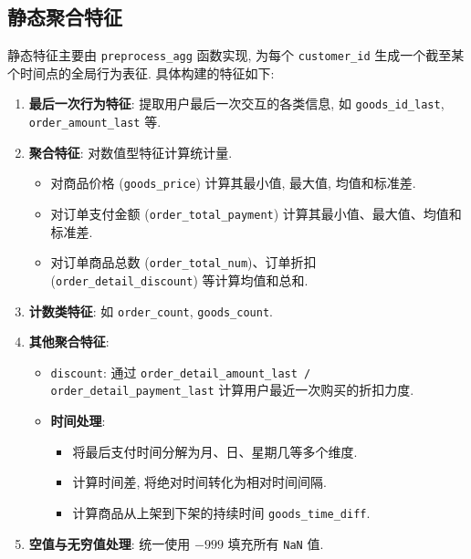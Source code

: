 \documentclass[11pt, a4paper]{article}
\begin{document}
\subsection{静态聚合特征}
静态特征主要由 \texttt{preprocess\_agg} 函数实现, 为每个 \texttt{customer\_id} 生成一个截至某个时间点的全局行为表征. 具体构建的特征如下:
\begin{enumerate}
    \item \textbf{最后一次行为特征}: 提取用户最后一次交互的各类信息, 如 \texttt{goods\_id\_last}, \texttt{order\_amount\_last} 等.
    \item \textbf{聚合特征}: 对数值型特征计算统计量.
    \begin{itemize}
        \item 对商品价格 (\texttt{goods\_price}) 计算其最小值, 最大值, 均值和标准差.
        \item 对订单支付金额 (\texttt{order\_total\_payment}) 计算其最小值、最大值、均值和标准差.
        \item 对订单商品总数 (\texttt{order\_total\_num})、订单折扣 (\texttt{order\_detail\_discount}) 等计算均值和总和.
    \end{itemize}
    \item \textbf{计数类特征}: 如 \texttt{order\_count}, \texttt{goods\_count}.
    \item \textbf{其他聚合特征}:
    \begin{itemize}
        \item \texttt{discount}: 通过 \texttt{order\_detail\_amount\_last / order\_detail\_payment\_last} 计算用户最近一次购买的折扣力度.
        \item \textbf{时间处理}:
        \begin{itemize}
            \item 将最后支付时间分解为月、日、星期几等多个维度.
            \item 计算时间差, 将绝对时间转化为相对时间间隔.
            \item 计算商品从上架到下架的持续时间 \texttt{goods\_time\_diff}.
        \end{itemize}
    \end{itemize}
    \item \textbf{空值与无穷值处理}: 统一使用 $-999$ 填充所有 \texttt{NaN} 值.
\end{enumerate}
\end{document}
